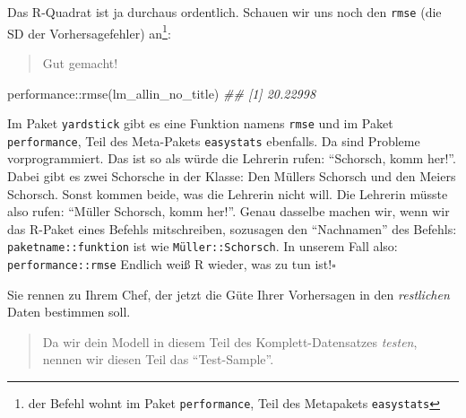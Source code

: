 \documentclass[
  a4paper,
]{scrbook}
\newenvironment{Shaded}{\begin{snugshade}}{\end{snugshade}}
\newcommand{\DocumentationTok}[1]{\textcolor[rgb]{0.37,0.37,0.37}{\textit{#1}}}
\newcommand{\FunctionTok}[1]{\textcolor[rgb]{0.28,0.35,0.67}{#1}}
\newcommand{\NormalTok}[1]{\textcolor[rgb]{0.00,0.23,0.31}{#1}}
\newcommand{\SpecialCharTok}[1]{\textcolor[rgb]{0.37,0.37,0.37}{#1}}
\theoremstyle{definition}
\theoremstyle{definition}
\theoremstyle{definition}
\theoremstyle{remark}
\begin{document}
Das R-Quadrat ist ja durchaus ordentlich. Schauen wir uns noch den
\texttt{rmse} (die SD der Vorhersagefehler) an\footnote{der Befehl wohnt
  im Paket \texttt{performance}, Teil des Metapakets \texttt{easystats}}:

\begin{quote}
{} Gut gemacht!
\end{quote}

\begin{Shaded}
\begin{Highlighting}[]
\NormalTok{performance}\SpecialCharTok{::}\FunctionTok{rmse}\NormalTok{(lm\_allin\_no\_title)}
\DocumentationTok{\#\# [1] 20.22998}
\end{Highlighting}
\end{Shaded}

\begin{tcolorbox}[enhanced jigsaw, colbacktitle=quarto-callout-caution-color!10!white, bottomrule=.15mm, left=2mm, breakable, rightrule=.15mm, coltitle=black, title=\textcolor{quarto-callout-caution-color}{\faFire}\hspace{0.5em}{Name Clash}, colback=white, leftrule=.75mm, titlerule=0mm, opacityback=0, bottomtitle=1mm, toprule=.15mm, arc=.35mm, toptitle=1mm, opacitybacktitle=0.6, colframe=quarto-callout-caution-color-frame]

Im Paket \texttt{yardstick} gibt es eine Funktion namens \texttt{rmse}
und im Paket \texttt{performance}, Teil des Meta-Pakets
\texttt{easystats} ebenfalls. Da sind Probleme vorprogrammiert. Das ist
so als würde die Lehrerin rufen: ``Schorsch, komm her!''. Dabei gibt es
zwei Schorsche in der Klasse: Den Müllers Schorsch und den Meiers
Schorsch. Sonst kommen beide, was die Lehrerin nicht will. Die Lehrerin
müsste also rufen: ``Müller Schorsch, komm her!''. Genau dasselbe machen
wir, wenn wir das R-Paket eines Befehls mitschreiben, sozusagen den
``Nachnamen'' des Befehls: \texttt{paketname::funktion} ist wie
\texttt{Müller::Schorsch}. In unserem Fall also:
\texttt{performance::rmse} Endlich weiß R wieder, was zu tun
ist!\(\square\)

\end{tcolorbox}

Sie rennen zu Ihrem Chef, der jetzt die Güte Ihrer Vorhersagen in den
\emph{restlichen} Daten bestimmen soll.

\begin{quote}
{} Da wir dein Modell in diesem Teil des
Komplett-Datensatzes \emph{testen}, nennen wir diesen Teil das
``Test-Sample''.
\end{quote}
\end{document}
